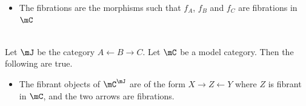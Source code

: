 \documentclass[a4paper]{article}
\begin{document}
\begin{prp}{}{}
\begin{itemize}
{}\\
by the universal property of pushouts. The cofibrations are such morphisms such that $i_A(f)$, $i_B(f)$ and $i_C(f)$ are cofibrations in $\mC$
\item The fibrations are the morphisms such that $f_A$, $f_B$ and $f_C$ are fibrations in $\mC$
\end{itemize}
\end{prp}

\begin{prp}{}{}\\ Let $\mJ$ be the category $A\leftarrow B\rightarrow C$. Let $\mC$ be a model category. Then the following are true. 
\begin{itemize}
\item The fibrant objects of $\mC^\mJ$ are of the form $X\rightarrow Z\leftarrow Y$ where $Z$ is fibrant in $\mC$, and the two arrows are fibrations. 
\end{itemize}
\end{prp}
\end{document}
